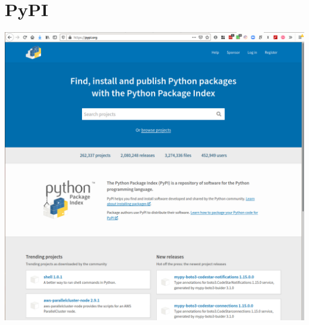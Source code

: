 \begin{frame}[fragile]
  \begin{example}
    
  \end{example}
\end{frame}

\begin{frame}[fragile]
  \begin{example}
    
  \end{example}
\end{frame}


\section{PyPI}

\begin{frame}
  \includegraphics[width=\columnwidth]{figs/pypi.png}
\end{frame}

